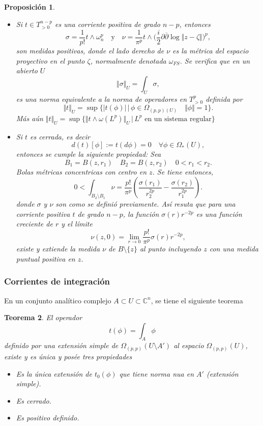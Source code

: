 \documentclass[letterpaper]{article}
\newtheorem{teorema}{Teorema}[section]
\newtheorem{prop}[teorema]{Proposici\'on}
\newcommand{\con}{\ensuremath{\mathbb{C}^n}}
\begin{document}
\begin{prop}
\begin{itemize}
        \item[4] Si $t\in T^{n-p}_{>0}$ es una corriente positiva de grado $n-p$, entonces
        \[
            \sigma=\frac{1}{p!}t\wedge\omega_n^{p}
            \quad\text{y}\quad
            \nu=\frac{1}{\pi^p}t\wedge\Big(\frac{i}{2}\partial\overline{\partial}\log\Vert z-\zeta\Vert\Big)^{p},
        \]
        son medidas positivas, donde el lado derecho de $\nu$ es la métrica del espacio proyectivo en el punto $\zeta$, normalmente denotada $\omega_{FS}$. Se verifica que en un abierto $U$
        \[
            \Vert\sigma\Vert_{U}=\int_{U}\sigma,
        \]
        es una norma equivalente a la norma de operadores en $T^p_{>0}$ definida por
        \[
            \Vert t\Vert_U=\sup\{|t(\phi)|\,\vert\,\phi\in \Omega_{(p,p)(U)}\quad\Vert\phi\Vert=1\}.
        \]
        Más aún $\Vert t\Vert_U=\sup\{\Vert t\wedge\omega(L^{p})\Vert_U\,\vert\,L^{p}\text{ en un sistema regular}\}$
        \item[5] Si $t$ es cerrada, es decir
        \[
            d(t)[\phi]:=t(d\phi)=0\quad\forall\phi\in\Omega_{*}(U),
        \]
        entonces se cumple la siguiente propiedad: Sea
        \[
            B_1=B(z,r_1)\quad B_2=B(z,r_2)\quad 0<r_1<r_2.
        \]
        Bolas métricas concentricas con centro en $z$. Se tiene entonces,
        \[
            0<\int_{B_2\setminus B_1}\nu= \frac{p!}{\pi^{p}}(\frac{\sigma(r_1)}{r^{2p}_2}-\frac{\sigma(r_2)}{r^{2p}_1}).
        \]
        donde $\sigma$ y $\nu$ son como se definió previamente. Así resuta que para una corriente positiva $t$ de grado $n-p$, la función $\sigma(r)r^{-2p}$ es una función creciente de $r$ y el límite
        \[
            \nu(z,0)=\lim_{r\rightarrow 0}\frac{p!}{\pi^{p}}\sigma(r)r^{-2p},
        \]
        existe y extiende la medida $\nu$ de $B\setminus\{z\}$ al punto incluyendo $z$ con una medida puntual positiva en $z$.
    \end{itemize}
\end{prop}
\subsubsection{Corrientes de integración}
\label{sec:orgdb30ad8}
En un conjunto analítico complejo \(A\subset U\subset\con\), se tiene el siguiente teorema
\begin{teorema}
El operador
\[
    t(\phi)=\int_A\phi
\]
definido por una extensión simple de $\Omega_{(p,p)}(U\setminus A')$ al espacio $\Omega_{(p,p)}(U)$, existe y es única y posée tres propiedades
\begin{itemize}
    \item[a] Es la única extensión de $t_0(\phi)$ que tiene norma nua en $A'$ (extensión simple).
    \item[b] Es cerrado.
    \item[c] Es positivo definido.
\end{itemize}
\end{teorema}
\end{document}
